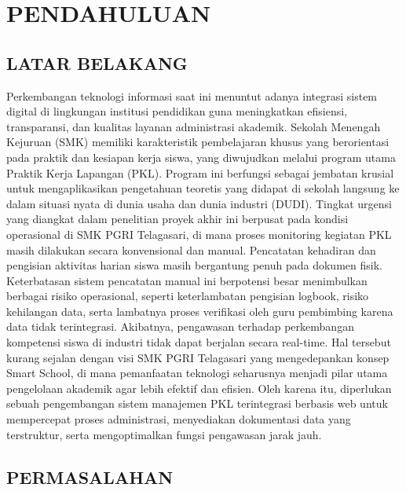 \chapter{PENDAHULUAN}

\section{LATAR BELAKANG}

Perkembangan teknologi informasi saat ini menuntut adanya integrasi sistem digital di lingkungan institusi pendidikan guna meningkatkan efisiensi, transparansi, dan kualitas layanan administrasi akademik. Sekolah Menengah Kejuruan (SMK) memiliki karakteristik pembelajaran khusus yang berorientasi pada praktik dan kesiapan kerja siswa, yang diwujudkan melalui program utama Praktik Kerja Lapangan (PKL). Program ini berfungsi sebagai jembatan krusial untuk mengaplikasikan pengetahuan teoretis yang didapat di sekolah langsung ke dalam situasi nyata di dunia usaha dan dunia industri (DUDI). Tingkat urgensi yang diangkat dalam penelitian proyek akhir ini berpusat pada kondisi operasional di SMK PGRI Telagasari, di mana proses monitoring kegiatan PKL masih dilakukan secara konvensional dan manual. Pencatatan kehadiran dan pengisian aktivitas harian siswa masih bergantung penuh pada dokumen fisik. Keterbatasan sistem pencatatan manual ini berpotensi besar menimbulkan berbagai risiko operasional, seperti keterlambatan pengisian logbook, risiko kehilangan data, serta lambatnya proses verifikasi oleh guru pembimbing karena data tidak terintegrasi. Akibatnya, pengawasan terhadap perkembangan kompetensi siswa di industri tidak dapat berjalan secara real-time. Hal tersebut kurang sejalan dengan visi SMK PGRI Telagasari yang mengedepankan konsep Smart School, di mana pemanfaatan teknologi seharusnya menjadi pilar utama pengelolaan akademik agar lebih efektif dan efisien. Oleh karena itu, diperlukan sebuah pengembangan sistem manajemen PKL terintegrasi berbasis web untuk mempercepat proses administrasi, menyediakan dokumentasi data yang terstruktur, serta mengoptimalkan fungsi pengawasan jarak jauh.

\section{PERMASALAHAN}

